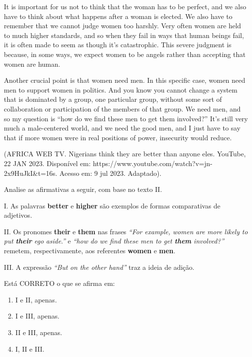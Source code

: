 It is important for us not to think that the woman has to be perfect, and we also have to think about what happens after a woman is elected. We also have to remember that we cannot judge women too harshly. Very often women are held to much higher standards, and so when they fail in ways that human beings fail, it is often made to seem as though it's catastrophic. This severe judgment is because, in some ways, we expect women to be angels rather than accepting that women are human.

Another crucial point is that women need men. In this specific case, women need men to support women in politics. And you know you cannot change a system that is dominated by a group, one particular group, without some sort of collaboration or participation of the members of that group. We need men, and so my question is “how do we find these men to get them involved?” It's still very much a male-centered world, and we need the good men, and I just have to say that if more women were in real positions of power, insecurity would reduce.

(AFRICA WEB TV. Nigerians think they are better than anyone eles. YouTube, 22 JAN 2023. Disponível em: https://www.youtube.com/watch?v=jn-2x9HuJkI&t=16s. Acesso em: 9 jul 2023. Adaptado).

\par\medskip Analise as afirmativas a seguir, com base no texto II.

I. As palavras \textbf{better} e \textbf{higher} são exemplos de formas comparativas de adjetivos.

II. Os pronomes \textbf{their} e \textbf{them} nas frases \textit{“For example, women are more likely to put \textbf{their} ego aside.”} e \textit{“how do we find these men to get \textbf{them} involved?”} remetem, respectivamente, aos referentes \textbf{women} e \textbf{men}.

III. A expressão \textit{“But on the other hand”} traz a ideia de adição.

Está CORRETO o que se afirma em:
\begin{enumerate}
\item I e II, apenas.
\item I e III, apenas.
\item II e III, apenas.
\item I, II e III.
\end{enumerate}
